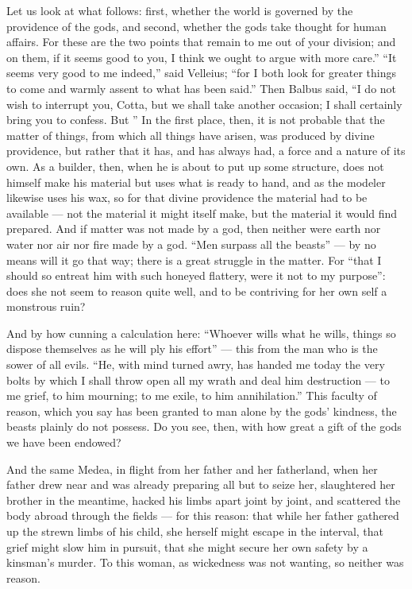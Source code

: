  Let us look at what follows: first, whether the world is governed by the providence of the gods, and second, whether the gods take thought for human affairs. For these are the two points that remain to me out of your division; and on them, if it seems good to you, I think we ought to argue with more care.'' ``It seems very good to me indeed,'' said Velleius; ``for I both look for greater things to come and warmly assent to what has been said.'' Then Balbus said, ``I do not wish to interrupt you, Cotta, but we shall take another occasion; I shall certainly bring you to confess. But '' In the first place, then, it is not probable that the matter of things, from which all things have arisen, was produced by divine providence, but rather that it has, and has always had, a force and a nature of its own. As a builder, then, when he is about to put up some structure, does not himself make his material but uses what is ready to hand, and as the modeler likewise uses his wax, so for that divine providence the material had to be available — not the material it might itself make, but the material it would find prepared. And if matter was not made by a god, then neither were earth nor water nor air nor fire made by a god. ``Men surpass all the beasts'' — by no means will it go that way; there is a great struggle in the matter. For ``that I should so entreat him with such honeyed flattery, were it not to my purpose'': does she not seem to reason quite well, and to be contriving for her own self a monstrous ruin?

 And by how cunning a calculation here: ``Whoever wills what he wills, things so dispose themselves as he will ply his effort'' — this from the man who is the sower of all evils. ``He, with mind turned awry, has handed me today the very bolts by which I shall throw open all my wrath and deal him destruction — to me grief, to him mourning; to me exile, to him annihilation.'' This faculty of reason, which you say has been granted to man alone by the gods' kindness, the beasts plainly do not possess. Do you see, then, with how great a gift of the gods we have been endowed?

 And the same Medea, in flight from her father and her fatherland, when her father drew near and was already preparing all but to seize her, slaughtered her brother in the meantime, hacked his limbs apart joint by joint, and scattered the body abroad through the fields — for this reason: that while her father gathered up the strewn limbs of his child, she herself might escape in the interval, that grief might slow him in pursuit, that she might secure her own safety by a kinsman's murder. To this woman, as wickedness was not wanting, so neither was reason.

